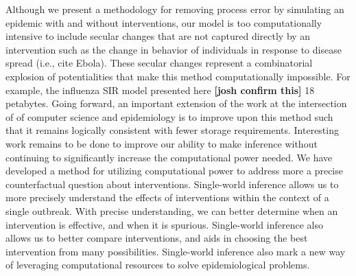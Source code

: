\documentclass[PTRSB]{rsos}
\begin{document}
Although we present a methodology for removing process error by simulating an epidemic with and without interventions, our model is too computationally intensive to include secular changes that are not captured directly by an intervention such as the change in behavior of individuals in response to disease spread (i.e., cite Ebola). 
These secular changes represent a combinatorial explosion of potentialities that make this method computationally impossible. 
For example, the influenza SIR model presented here \textbf{[josh confirm this]} 18 petabytes. 
Going forward, an important extension of the work at the intersection of of computer science and epidemiology is to improve upon this method such that it remains logically consistent with fewer storage requirements. 
Interesting work remains to be done to improve our ability to make inference without continuing to significantly increase the computational power needed.
We have developed a method for utilizing computational power to address more a precise counterfactual question about interventions. 
Single-world inference allows us to more precisely understand the effects of interventions within the context of a single outbreak. 
With precise understanding, we can better determine when an intervention is effective, and when it is spurious. Single-world inference also allows us to better compare interventions, and aids in choosing the best intervention from many possibilities. 
Single-world inference also mark a new way of leveraging computational resources to solve epidemiological problems.

\enlargethispage{20pt}











\end{document}
